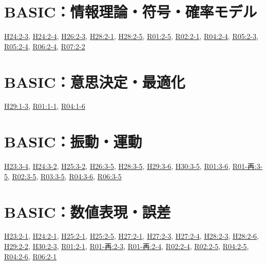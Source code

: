 \section{BASIC：情報理論・符号・確率モデル}
\hyperref[q:h24-reg-basic-2-3]{H24:2-3}, \hyperref[q:h24-reg-basic-2-4]{H24:2-4}, \hyperref[q:h26-reg-basic-2-3]{H26:2-3}, \hyperref[q:h28-reg-basic-2-1]{H28:2-1}, \hyperref[q:h28-reg-basic-2-5]{H28:2-5}, \hyperref[q:r01-reg-basic-2-5]{R01:2-5}, \hyperref[q:r02-reg-basic-2-1]{R02:2-1}, \hyperref[q:r04-reg-basic-2-4]{R04:2-4}, \hyperref[q:r05-reg-basic-2-3]{R05:2-3}, \hyperref[q:r05-reg-basic-2-4]{R05:2-4}, \hyperref[q:r06-reg-basic-2-4]{R06:2-4}, \hyperref[q:r07-reg-basic-2-2]{R07:2-2}
\section{BASIC：意思決定・最適化}
\hyperref[q:h29-reg-basic-1-3]{H29:1-3}, \hyperref[q:r01-reg-basic-1-1]{R01:1-1}, \hyperref[q:r04-reg-basic-1-6]{R04:1-6}
\section{BASIC：振動・運動}
\hyperref[q:h23-reg-basic-3-4]{H23:3-4}, \hyperref[q:h24-reg-basic-3-2]{H24:3-2}, \hyperref[q:h25-reg-basic-3-2]{H25:3-2}, \hyperref[q:h26-reg-basic-3-5]{H26:3-5}, \hyperref[q:h28-reg-basic-3-5]{H28:3-5}, \hyperref[q:h29-reg-basic-3-6]{H29:3-6}, \hyperref[q:h30-reg-basic-3-5]{H30:3-5}, \hyperref[q:r01-reg-basic-3-6]{R01:3-6}, \hyperref[q:r01-ret-basic-3-5]{R01-再:3-5}, \hyperref[q:r02-reg-basic-3-5]{R02:3-5}, \hyperref[q:r03-reg-basic-3-5]{R03:3-5}, \hyperref[q:r04-reg-basic-3-6]{R04:3-6}, \hyperref[q:r06-reg-basic-3-5]{R06:3-5}
\section{BASIC：数値表現・誤差}
\hyperref[q:h23-reg-basic-2-1]{H23:2-1}, \hyperref[q:h24-reg-basic-2-1]{H24:2-1}, \hyperref[q:h25-reg-basic-2-1]{H25:2-1}, \hyperref[q:h25-reg-basic-2-5]{H25:2-5}, \hyperref[q:h27-reg-basic-2-1]{H27:2-1}, \hyperref[q:h27-reg-basic-2-3]{H27:2-3}, \hyperref[q:h27-reg-basic-2-4]{H27:2-4}, \hyperref[q:h28-reg-basic-2-3]{H28:2-3}, \hyperref[q:h28-reg-basic-2-6]{H28:2-6}, \hyperref[q:h29-reg-basic-2-2]{H29:2-2}, \hyperref[q:h30-reg-basic-2-3]{H30:2-3}, \hyperref[q:r01-reg-basic-2-1]{R01:2-1}, \hyperref[q:r01-ret-basic-2-3]{R01-再:2-3}, \hyperref[q:r01-ret-basic-2-4]{R01-再:2-4}, \hyperref[q:r02-reg-basic-2-4]{R02:2-4}, \hyperref[q:r02-reg-basic-2-5]{R02:2-5}, \hyperref[q:r04-reg-basic-2-5]{R04:2-5}, \hyperref[q:r04-reg-basic-2-6]{R04:2-6}, \hyperref[q:r06-reg-basic-2-1]{R06:2-1}
